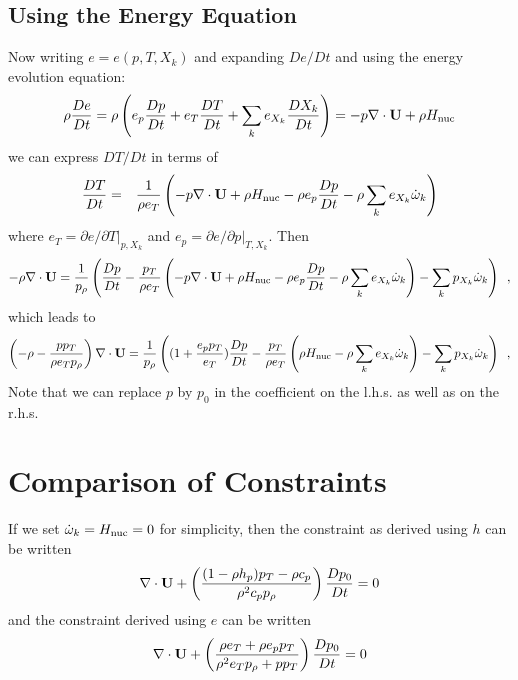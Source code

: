 \subsection{Using the Energy Equation}

Now writing $e = e(p,T,X_k)$ and expanding $De/Dt$ and using the energy evolution equation:
\begin{equation}
\rho \frac{D e}{Dt}  = \rho \left( e_p \frac{D p}{Dt} + e_T \frac{D T}{Dt} + \sum_k e_{X_k} \frac{D X_k}{Dt} \right)
                     = -p \nabla \cdot {\bf U} + \rho {H_{\rm nuc}}
\end{equation}
we can express $DT/Dt$ in terms of 
\begin{eqnarray*}
\frac{DT}{Dt} &=& \frac{1}{\rho e_T} \left(
                  -p \nabla \cdot {\bf U} + \rho {H_{\rm nuc}}
                 - \rho e_p \frac{D p}{Dt}
                 - \rho \sum_k e_{X_k} \dot{\omega}_k   \right)
\end{eqnarray*}
where $e_T = \left.\partial e/\partial T\right|_{p,X_k}$ 
and $e_p = \left.\partial e/\partial p\right|_{T,X_k}.$
Then
\begin{equation}
-\rho \nabla \cdot {\bf U} = 
    \frac{1}{p_\rho} \left( \frac{D p}{Dt} 
    - \frac{p_T}{\rho e_T} \left(
                 -p \nabla \cdot {\bf U} + \rho {H_{\rm nuc}}
                 - \rho e_p \frac{D p}{Dt}
                 - \rho \sum_k e_{X_k} \dot{\omega}_k   \right)
    - \sum_k p_{X_k} {\dot{\omega}}_k \right) \enskip ,
\end{equation}
which leads to 
\begin{equation}
\left(-\rho -  \frac{p p_T}{\rho e_T p_\rho} \right) \nabla \cdot {\bf U} = 
    \frac{1}{p_\rho} \left( (1 + \frac{e_p p_T}{e_T}) \frac{D p}{Dt} 
                           - \frac{p_T}{\rho e_T} \left(
                                        \rho {H_{\rm nuc}}
                                        - \rho \sum_k e_{X_k} \dot{\omega}_k   \right)
    - \sum_k p_{X_k} {\dot{\omega}}_k \right) \enskip ,
\end{equation}
Note that we can replace $p$ by $p_0$ in the coefficient on the l.h.s. as well as on the r.h.s.

\section{Comparison of Constraints}

If we set $\dot{\omega}_k = {H_{\rm nuc}} = 0$ for simplicity, then the constraint as derived using $h$ can be written 
\begin{equation}
\nabla \cdot {\bf U}
+ \left( \frac{(1 - \rho h_p )p_T - \rho c_p}{\rho^2
  c_p p_\rho} \right) \frac{D p_0}{D t} = 0
\end{equation}
and the constraint derived using $e$ can be written
\begin{equation}
\nabla \cdot {\bf U} 
+ \left( \frac{\rho e_T + \rho e_p p_T}{\rho^2 e_T p_\rho + p p_T} \right) \frac{D p_0}{D t} = 0
\end{equation}

